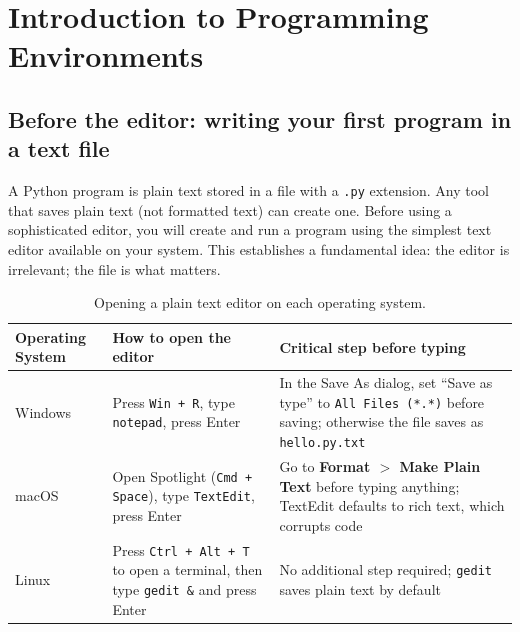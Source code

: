 \chapter{Introduction to Programming Environments}
\label{ch:intro-prog}

\section{Before the editor: writing your first program in a text file}
\label{sec:plaintext-first}

A Python program is plain text stored in a file with a \texttt{.py}
extension. Any tool that saves plain text (not formatted text) can
create one. Before using a sophisticated editor, you will create and
run a program using the simplest text editor available on your system.
This establishes a fundamental idea: the editor is irrelevant; the
file is what matters.

\begin{table}[htbp]
\centering
\caption{Opening a plain text editor on each operating system.}
\label{tab:text-editors}
\begin{tabular}{p{2.8cm} p{5.5cm} p{6.5cm}}
\toprule
\textbf{Operating System} & \textbf{How to open the editor} & \textbf{Critical step before typing} \\
\midrule
Windows &
Press \texttt{Win + R}, type \texttt{notepad}, press Enter &
In the Save As dialog, set ``Save as type'' to \texttt{All Files (*.*)} before saving; otherwise the file saves as \texttt{hello.py.txt} \\
\midrule
macOS &
Open Spotlight (\texttt{Cmd + Space}), type \texttt{TextEdit}, press Enter &
Go to \textbf{Format $>$ Make Plain Text} before typing anything; TextEdit defaults to rich text, which corrupts code \\
\midrule
Linux &
Press \texttt{Ctrl + Alt + T} to open a terminal, then type \texttt{gedit \&} and press Enter &
No additional step required; \texttt{gedit} saves plain text by default \\
\bottomrule
\end{tabular}
\end{table}

